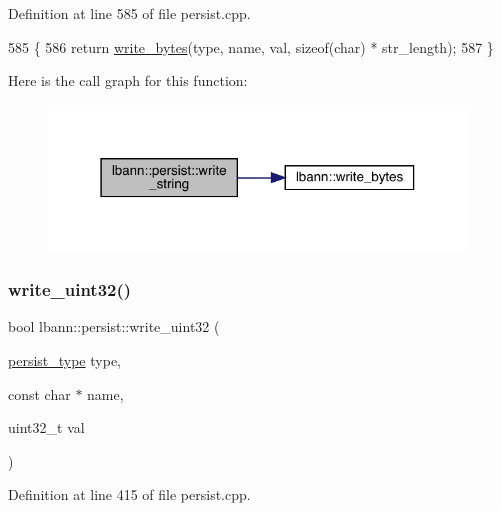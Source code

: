 Definition at line 585 of file persist.\+cpp.


\begin{DoxyCode}
585                                                                                                     \{
586   \textcolor{keywordflow}{return} \hyperlink{classlbann_1_1persist_a8729c7c90f4ca3090cd678fce91a0eb0}{write\_bytes}(type, name, val, \textcolor{keyword}{sizeof}(\textcolor{keywordtype}{char}) * str\_length);
587 \}
\end{DoxyCode}
Here is the call graph for this function\+:\nopagebreak
\begin{figure}[H]
\begin{center}
\leavevmode
\includegraphics[width=315pt]{classlbann_1_1persist_a04afef84e7caa8509e65367225ceeba5_cgraph}
\end{center}
\end{figure}
\mbox{\label{classlbann_1_1persist_a742334568de0aca958dbaf7bbabd3cba}} 
\subsubsection{\texorpdfstring{write\+\_\+uint32()}{write\_uint32()}}
{\footnotesize\ttfamily bool lbann\+::persist\+::write\+\_\+uint32 (\begin{DoxyParamCaption}\item[{\hyperlink{namespacelbann_adee41f31f15f3906cbdcce4a1417eb56}{persist\+\_\+type}}]{type,  }\item[{const char $\ast$}]{name,  }\item[{uint32\+\_\+t}]{val }\end{DoxyParamCaption})}



Definition at line 415 of file persist.\+cpp.


